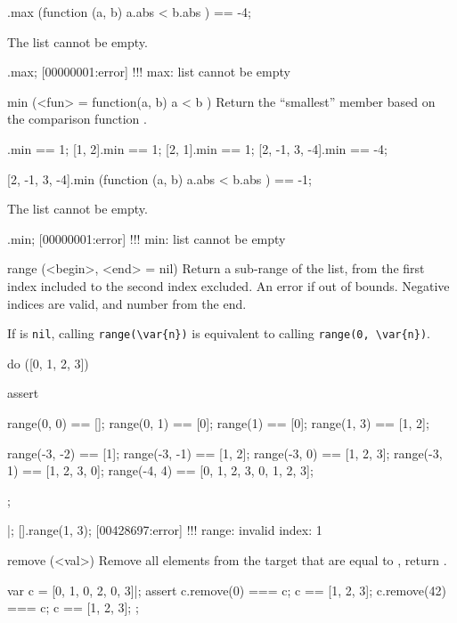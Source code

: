 \begin{urbiscriptapi}
\begin{urbiassert}
[2, -1, 3, -4].max (function (a, b) { a.abs < b.abs }) == -4;
\end{urbiassert}

The list cannot be empty.

\begin{urbiscript}
[].max;
[00000001:error] !!! max: list cannot be empty
\end{urbiscript}

\item[min](<fun> = function(a, b) { a < b })%
  Return the ``smallest'' member based on the comparison function .
\begin{urbiassert}
           [1].min == 1;
        [1, 2].min == 1;
        [2, 1].min == 1;
[2, -1, 3, -4].min == -4;

[2, -1, 3, -4].min (function (a, b) { a.abs < b.abs }) == -1;
\end{urbiassert}

The list cannot be empty.

\begin{urbiscript}
[].min;
[00000001:error] !!! min: list cannot be empty
\end{urbiscript}

\item[range](<begin>, <end> = nil)%
  Return a sub-range of the list, from the first index included to the
  second index excluded.  An error if out of bounds.  Negative indices
  are valid, and number from the end.

  If  is \lstinline|nil|, calling \lstinline|range(\var{n})|
  is equivalent to calling \lstinline|range(0, \var{n})|.

\begin{urbiscript}
do ([0, 1, 2, 3])
{
  assert
  {
    range(0, 0)   == [];
    range(0, 1)   == [0];
    range(1)      == [0];
    range(1, 3)   == [1, 2];

    range(-3, -2) == [1];
    range(-3, -1) == [1, 2];
    range(-3, 0)  == [1, 2, 3];
    range(-3, 1)  == [1, 2, 3, 0];
    range(-4, 4)  == [0, 1, 2, 3, 0, 1, 2, 3];
  };
}|;
[].range(1, 3);
[00428697:error] !!! range: invalid index: 1
\end{urbiscript}

\item[remove](<val>)%
  Remove all elements from the target that are equal to , return
  \this.

\begin{urbiscript}
var c = [0, 1, 0, 2, 0, 3]|;
assert
{
  c.remove(0) === c;   c ==  [1, 2, 3];
  c.remove(42) === c;  c ==  [1, 2, 3];
};
\end{urbiscript}


\end{urbiscriptapi}
